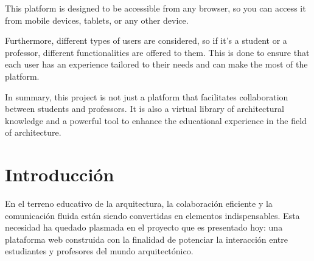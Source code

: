 \documentclass[a4paper, 12pt]{book}
\begin{document}
This platform is designed to be accessible from any browser, so you can access it from mobile devices, tablets, or any other device.

Furthermore, different types of users are considered, so if it's a student or a professor, different functionalities are 
offered to them. This is done to ensure that each user has an experience tailored to their needs and can make the most of 
the platform.

In summary, this project is not just a platform that facilitates collaboration between students and professors. It is also a 
virtual library of architectural knowledge and a powerful tool to enhance the educational experience in the field of architecture.



\tableofcontents 
\cleardoublepage
\listoffigures %



\cleardoublepage
\chapter{Introducción}
\label{sec:intro} %

En el terreno educativo de la arquitectura, la colaboración eficiente y la comunicación fluida están siendo convertidas en elementos 
indispensables. Esta necesidad ha quedado plasmada en el proyecto que es presentado hoy: una plataforma web construida con la finalidad 
de potenciar la interacción entre estudiantes y profesores del mundo arquitectónico.
\end{document}
